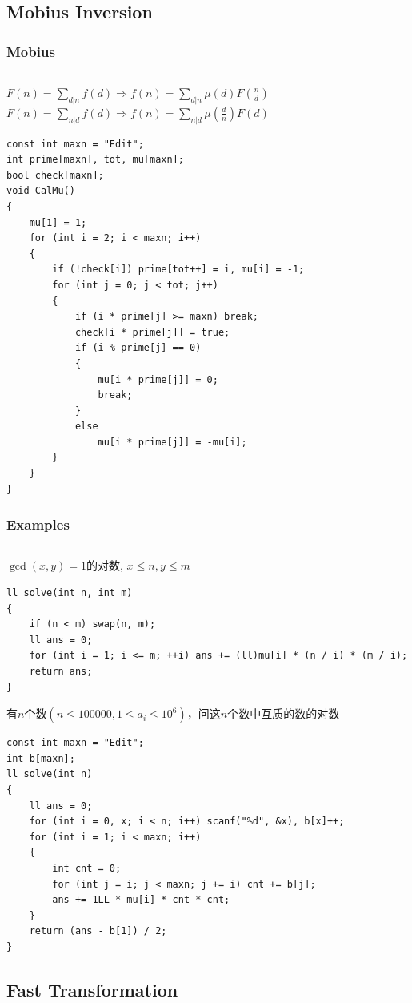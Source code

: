 \documentclass[twoside]{article}
\begin{document}
\subsection{Mobius Inversion}
\subsubsection{Mobius}
\begin{lstlisting}
\end{lstlisting}
$F(n)=\sum_{d|n}f(d)\Rightarrow f(n)=\sum_{d|n}\mu(d)F(\frac{n}{d})$\\
$F(n)=\sum_{n|d}f(d)\Rightarrow f(n)=\sum_{n|d}\mu(\frac{d}{n})F(d)$
\begin{lstlisting}
const int maxn = "Edit";
int prime[maxn], tot, mu[maxn];
bool check[maxn];
void CalMu()
{
    mu[1] = 1;
    for (int i = 2; i < maxn; i++)
    {
        if (!check[i]) prime[tot++] = i, mu[i] = -1;
        for (int j = 0; j < tot; j++)
        {
            if (i * prime[j] >= maxn) break;
            check[i * prime[j]] = true;
            if (i % prime[j] == 0)
            {
                mu[i * prime[j]] = 0;
                break;
            }
            else
                mu[i * prime[j]] = -mu[i];
        }
    }
}
\end{lstlisting}
\subsubsection{Examples}
\begin{lstlisting}
\end{lstlisting}
$\gcd(x,y)=1$的对数, $x \leq n, y \leq m$
\begin{lstlisting}
ll solve(int n, int m)
{
    if (n < m) swap(n, m);
    ll ans = 0;
    for (int i = 1; i <= m; ++i) ans += (ll)mu[i] * (n / i) * (m / i);
    return ans;
}
\end{lstlisting}
有$n$个数$(n \leq 100000,1 \le  a_i \le 10 ^ 6)$，问这$n$个数中互质的数的对数
\begin{lstlisting}
const int maxn = "Edit";
int b[maxn];
ll solve(int n)
{
    ll ans = 0;
    for (int i = 0, x; i < n; i++) scanf("%d", &x), b[x]++;
    for (int i = 1; i < maxn; i++)
    {
        int cnt = 0;
        for (int j = i; j < maxn; j += i) cnt += b[j];
        ans += 1LL * mu[i] * cnt * cnt;
    }
    return (ans - b[1]) / 2;
}
\end{lstlisting}
\subsection{Fast Transformation}
\end{document}
